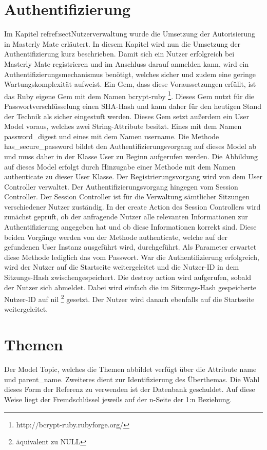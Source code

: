 \section{Authentifizierung}\label{ref:sectAuthentifizierung}
\begin{k}
Im Kapitel ref{ref:sectNutzerverwaltung} wurde die Umsetzung der Autorisierung
in Masterly Mate erläutert. In diesem Kapitel wird nun die Umsetzung der
Authentifizierung kurz beschrieben. Damit sich ein Nutzer erfolgreich bei
Masterly Mate registrieren und im Anschluss darauf anmelden kann, wird ein
Authentifizierungsmechanismus benötigt, welches sicher und zudem eine geringe
Wartungskomplexität aufweist. Ein Gem, dass diese Voraussetzungen erfüllt, ist
das Ruby eigene Gem mit dem Namen bcrypt-ruby
\footnote{http://bcrypt-ruby.rubyforge.org/}. Dieses Gem nutzt für die
Passwortverschlüsselung einen SHA-Hash und kann daher für den
heutigen Stand der Technik als sicher eingestuft werden. Dieses Gem setzt
außerdem ein User Model voraus, welches zwei String-Attribute besitzt. Eines mit
dem Namen password_digest und eines mit dem Namen username. Die Methode
has_secure_password bildet den Authentifizierungsvorgang auf dieses Model ab und
muss daher in der Klasse User zu Beginn aufgerufen werden. Die Abbildung auf
dieses Model erfolgt durch Hinzugabe einer Methode mit dem Namen authenticate zu
dieser User Klasse. Der Registrierungsvorgang wird von dem User Controller
verwaltet. Der Authentifizierungsvorgang hingegen vom Session Controller. Der
Session Controller ist für die Verwaltung sämtlicher Sitzungen verschiedener Nutzer
zuständig. In der create Action des Session Controllers wird zunächst geprüft,
ob der anfragende Nutzer alle relevanten Informationen zur Authentifizierung
angegeben hat und ob diese Informationen korrekt sind. Diese beiden Vorgänge
werden von der Methode authenticate, welche auf der gefundenen User
Instanz ausgeführt wird, durchgeführt. Als Parameter erwartet diese Methode lediglich
das vom Passwort. War die Authentifizierung erfolgreich, wird der Nutzer auf die
Startseite weitergeleitet und die Nutzer-ID in dem
Sitzungs-Hash zwischengespeichert. Die destroy action wird aufgerufen, sobald
der Nutzer sich abmeldet. Dabei wird einfach die im Sitzungs-Hash gespeicherte
Nutzer-ID auf nil \footnote{äquivalent zu NULL} gesetzt. Der Nutzer wird danach
ebenfalls auf die Startseite weitergeleitet.
\end{k}

\section{Themen}
Der Model Topic, welches die Themen abbildet verfügt über die Attribute name und
parent\_name. Zweiteres dient zur Identifizierung des Überthemas. Die Wahl
dieses Form der Referenz zu verwenden ist der Datenbank geschuldet. Auf diese Weise
liegt der Fremdschlüssel jeweils auf der n-Seite der 1:n Beziehung.
